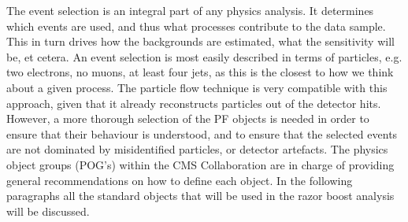 The event selection is an integral part of any physics analysis. It determines which events are
used, and thus what processes contribute to the data sample. This in turn drives how the
backgrounds are estimated, what the sensitivity will be, et cetera. 
An event selection is most easily described in terms of particles, e.g. two electrons, no muons, at
least four jets, as this is the closest to how we think about a given process.  
The particle flow technique is very compatible with this approach, given that it already
reconstructs particles out of the detector hits. 
However, a more thorough selection of the PF objects is needed in order to ensure that their
behaviour is understood, and to ensure that the selected events are not dominated by
misidentified particles, or detector artefacts. 
The physics object groups (POG's) within the CMS Collaboration are in charge of providing general
recommendations on how to define each object. 
In the following paragraphs all the standard objects that will be used in the razor boost analysis
will be discussed.

% 







